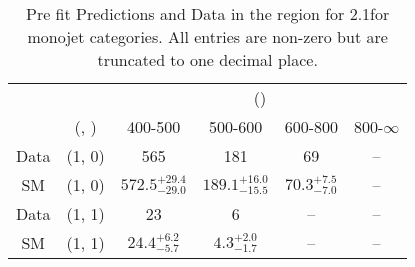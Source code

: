 \begin{table}[h!]
\tiny
\centering
\caption{Pre fit Predictions and Data in the \gj region for 2.1\ifb for monojet categories. All entries are non-zero but are truncated to one decimal place.\label{tab:predallnaive_gj_comb_mono}}
\begin{tabular}
{cccccc}
	\hline\hline
	&	& \multicolumn{4}{c}{\scalht (\gev)}\\ 
	&	 (\njet, \nb) & 400-500 & 500-600 & 600-800 & 800-$\infty$ \\ [0.8ex] 
\hline
	Data & (1, 0) & 565 & 181 & 69 & -- \\[0.5ex] 
	SM & (1, 0) & $572.5^{+ 29.4 }_{- 29.0 }$ & $189.1^{+ 16.0 }_{- 15.5 }$ & $70.3^{+ 7.5 }_{- 7.0 }$ & -- \\[0.5ex] 
	Data & (1, 1) & 23 & 6 & -- & -- \\[0.5ex] 
	SM & (1, 1) & $24.4^{+ 6.2 }_{- 5.7 }$ & $4.3^{+ 2.0 }_{- 1.7 }$ & -- & -- \\[0.5ex] 
	\hline
	\hline
\end{tabular}
\end{table}
